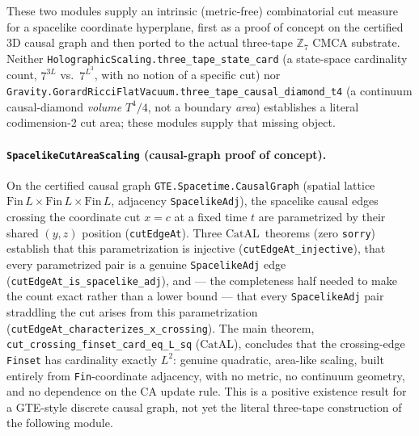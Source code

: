 \documentclass[11pt,a4paper]{article}
\theoremstyle{definition}
\newcommand{\CatAL}{\ensuremath{\mathrm{CatAL}}}
\begin{document}
These two modules supply an intrinsic (metric-free) combinatorial cut measure for a
spacelike coordinate hyperplane, first as a proof of concept on the certified 3D causal
graph and then ported to the actual three-tape $\mathbb{Z}_7$ CMCA substrate. Neither
\lstinline|HolographicScaling.three_tape_state_card| (a state-space cardinality count,
$7^{3L}$ vs.\ $7^{L^3}$, with no notion of a specific cut) nor
\lstinline|Gravity.GorardRicciFlatVacuum.three_tape_causal_diamond_t4| (a continuum
causal-diamond \emph{volume} $T^4/4$, not a boundary \emph{area}) establishes a literal
codimension-2 cut area; these modules supply that missing object.

\paragraph{\texttt{SpacelikeCutAreaScaling} (causal-graph proof of concept).}
On the certified causal graph \lstinline|GTE.Spacetime.CausalGraph| (spatial lattice
$\mathrm{Fin}\,L \times \mathrm{Fin}\,L \times \mathrm{Fin}\,L$, adjacency
\lstinline|SpacelikeAdj|), the spacelike causal edges crossing the coordinate cut
$x = c$ at a fixed time $t$ are parametrized by their shared $(y,z)$ position
(\lstinline|cutEdgeAt|). Three \CatAL\ theorems (zero \texttt{sorry}) establish that
this parametrization is injective (\lstinline|cutEdgeAt_injective|), that every
parametrized pair is a genuine \lstinline|SpacelikeAdj| edge
(\lstinline|cutEdgeAt_is_spacelike_adj|), and --- the completeness half needed to make
the count exact rather than a lower bound --- that every \lstinline|SpacelikeAdj| pair
straddling the cut arises from this parametrization
(\lstinline|cutEdgeAt_characterizes_x_crossing|). The main theorem,
\lstinline|cut_crossing_finset_card_eq_L_sq| (\CatAL), concludes that the crossing-edge
\lstinline|Finset| has cardinality exactly $L^2$: genuine quadratic, area-like scaling,
built entirely from \lstinline|Fin|-coordinate adjacency, with no metric, no continuum
geometry, and no dependence on the CA update rule. This is a positive existence result
for a GTE-style discrete causal graph, not yet the literal three-tape construction of
the following module.
\end{document}

